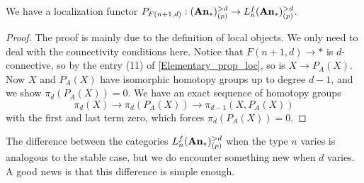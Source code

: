 	\begin{coro}
		We have a localization functor $P_{F(n+1,d)}:(\mathbf{An}_*)_{(p)}^{>d}\to L_n^f(\mathbf{An}_*)_{(p)}^{>d}$. 
	\end{coro}
	\begin{proof}
		The proof is mainly due to the definition of local objects. We only need to deal with the connectivity conditions here. Notice that $F(n+1,d)\to *$ is $d$-connective, so by the entry (11) of \cref{Elementary_prop_loc}, so is $X\to P_A(X)$. Now $X$ and $P_A(X)$ have isomorphic homotopy groups up to degree $d-1$, and we show $\pi_d(P_A(X))=0$. We have an exact sequence of homotopy groups 
		\[ \pi_d(X)\to\pi_d(P_A(X))\to\pi_{d-1}(X,P_A(X)) \] 
		with the first and last term zero, which forces $\pi_d(P_A(X))=0$. 
	\end{proof}

	The difference between the categories $L_n^f(\mathbf{An}_*)_{(p)}^{>d}$ when the type $n$ varies is analogous to the stable case, but we do encounter something new when $d$ varies. A good news is that this difference is simple enough. 

